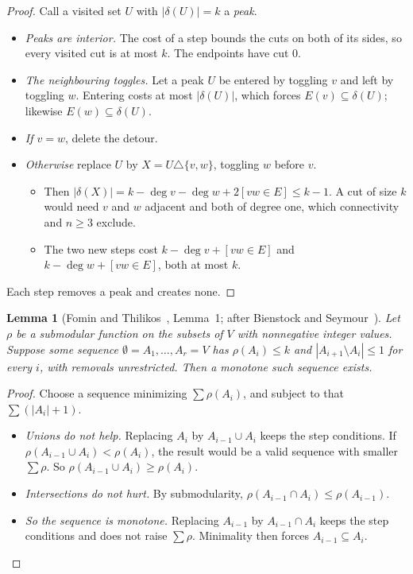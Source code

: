 \documentclass[11pt]{article}
\newtheorem{lemma}[theorem]{Lemma}
\theoremstyle{definition}
\theoremstyle{remark}
\begin{document}
\begin{proof}
Call a visited set $U$ with $|\delta(U)|=k$ a \emph{peak}.
\begin{itemize}
\item \emph{Peaks are interior.} The cost of a step bounds the cuts on both
of its sides, so every visited cut is at most $k$. The endpoints have cut
$0$.
\item \emph{The neighbouring toggles.} Let a peak $U$ be entered by toggling
$v$ and left by toggling $w$. Entering costs at most $|\delta(U)|$, which
forces $E(v)\subseteq\delta(U)$; likewise $E(w)\subseteq\delta(U)$.
\item \emph{If $v=w$}, delete the detour.
\item \emph{Otherwise} replace $U$ by $X=U\triangle\{v,w\}$, toggling $w$
before $v$.
\begin{itemize}
\item Then $|\delta(X)|=k-\deg v-\deg w+2[vw\in E]\le k-1$. A cut of size
$k$ would need $v$ and $w$ adjacent and both of degree one, which connectivity
and $n\ge3$ exclude.
\item The two new steps cost $k-\deg v+[vw\in E]$ and $k-\deg w+[vw\in E]$,
both at most $k$.
\end{itemize}
\end{itemize}
Each step removes a peak and creates none. \qedhere
\end{proof}

\begin{lemma}[Fomin and Thilikos~\cite{FT03}, Lemma~1; after Bienstock and Seymour~\cite{BS91}]\label{lem:FT}
Let $\rho$ be a submodular function on the subsets of $V$ with nonnegative
integer values. Suppose some sequence
$\emptyset=A_1,\dots,A_r=V$ has $\rho(A_i)\le k$ and $|A_{i+1}\setminus
A_i|\le1$ for every $i$, with removals unrestricted. Then a monotone such
sequence exists.
\end{lemma}

\begin{proof}
Choose a sequence minimizing $\sum\rho(A_i)$, and subject to that
$\sum(|A_i|+1)$.
\begin{itemize}
\item \emph{Unions do not help.} Replacing $A_i$ by $A_{i-1}\cup A_i$ keeps the
step conditions. If $\rho(A_{i-1}\cup A_i)<\rho(A_i)$, the result would be a
valid sequence with smaller $\sum\rho$. So
$\rho(A_{i-1}\cup A_i)\ge\rho(A_i)$.
\item \emph{Intersections do not hurt.} By submodularity,
$\rho(A_{i-1}\cap A_i)\le\rho(A_{i-1})$.
\item \emph{So the sequence is monotone.} Replacing $A_{i-1}$ by
$A_{i-1}\cap A_i$ keeps the step conditions and does not raise
$\sum\rho$. Minimality then forces $A_{i-1}\subseteq A_i$. \qedhere
\end{itemize}
\end{proof}
\end{document}
